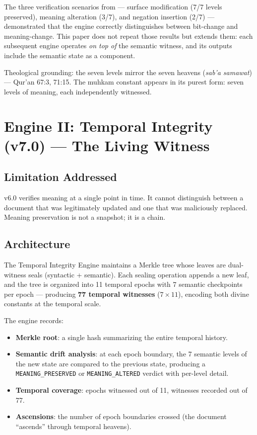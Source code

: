 \documentclass[11pt,a4paper]{article}
\begin{document}
The three verification scenarios from \cite{arfeen2026crossing} --- surface modification (7/7 levels preserved), meaning alteration (3/7), and negation insertion (2/7) --- demonstrated that the engine correctly distinguishes between bit-change and meaning-change. This paper does not repeat those results but extends them: each subsequent engine operates \textit{on top of} the semantic witness, and its outputs include the semantic state as a component.

Theological grounding: the seven levels mirror the seven heavens (\textit{sab'a samawat}) --- Qur'an 67:3, 71:15. The muhkam constant appears in its purest form: seven levels of meaning, each independently witnessed.


\section{Engine II: Temporal Integrity (v7.0) --- The Living Witness}

\subsection{Limitation Addressed}

v6.0 verifies meaning at a single point in time. It cannot distinguish between a document that was legitimately updated and one that was maliciously replaced. Meaning preservation is not a snapshot; it is a chain.

\subsection{Architecture}

The Temporal Integrity Engine maintains a Merkle tree whose leaves are dual-witness seals (syntactic + semantic). Each sealing operation appends a new leaf, and the tree is organized into 11 temporal epochs with 7 semantic checkpoints per epoch --- producing \textbf{77 temporal witnesses} ($7 \times 11$), encoding both divine constants at the temporal scale.

The engine records:
\begin{itemize}[nosep]
    \item \textbf{Merkle root}: a single hash summarizing the entire temporal history.
    \item \textbf{Semantic drift analysis}: at each epoch boundary, the 7 semantic levels of the new state are compared to the previous state, producing a \texttt{MEANING\_PRESERVED} or \texttt{MEANING\_ALTERED} verdict with per-level detail.
    \item \textbf{Temporal coverage}: epochs witnessed out of 11, witnesses recorded out of 77.
    \item \textbf{Ascensions}: the number of epoch boundaries crossed (the document ``ascends'' through temporal heavens).
\end{itemize}
\end{document}
